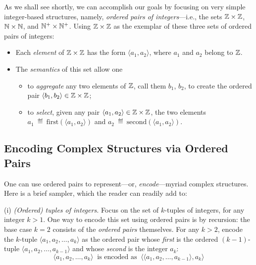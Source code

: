 As we shall see shortly, we can accomplish our goals by focusing on very simple integer-based structures, namely, {\em ordered pairs of integers}---i.e., the sets $\mathbb{Z} \times \mathbb{Z}$, $\mathbb{N} \times \mathbb{N}$, and $\mathbb{N}^+ \times \mathbb{N}^+$.  Using $\mathbb{Z} \times \mathbb{Z}$ as the exemplar of these three sets of ordered pairs of integers:
\begin{itemize}
\item
Each {\em element} of $\mathbb{Z} \times \mathbb{Z}$ has the form $\langle a_1, a_2 \rangle$, where $a_1$ and $a_2$ belong to $\mathbb{Z}$.
\medskip\item
The {\em semantics} of this set allow one
  \begin{itemize}
  \item
to {\em aggregate} any two elements of $\mathbb{Z}$, call them $b_1$, $b_2$, to create the ordered pair $\langle b_1, b_2 \rangle \in \mathbb{Z} \times \mathbb{Z}$;
  \medskip\item
to {\em select}, given any pair $\langle a_1, a_2 \rangle \in \mathbb{Z} \times \mathbb{Z}$,  the two elements $a_1 \ \eqdef \ \mbox{first}(\langle a_1, a_2 \rangle)$ and $a_2 \ \eqdef \ \mbox{second}(\langle a_1, a_2 \rangle)$.
  \end{itemize}
\end{itemize}

\subsection{Encoding Complex Structures via Ordered Pairs}
\label{sec:encodings-via-ordered-pairs}

One can use ordered pairs to represent---or, {\it encode}---myriad complex structures.  Here is a brief sampler, which the reader can readily add to:


\medskip

\noindent
(i) {\em (Ordered) tuples of integers.}
Focus on the set of $k$-tuples of integers, for any integer $k > 1$.  One way to encode this set using ordered pairs is by recursion:  the base case $k=2$ consists of the {\em ordered pairs} themselves.  For any $k > 2$, encode the $k$-tuple $\langle a_1, a_2, \ldots, a_k \rangle$ as the ordered pair whose {\em first} is the ordered $(k-1)$-tuple $\langle a_1, a_2, \ldots, a_{k-1} \rangle$ and whose {\em second} is the integer $a_k$:
\[ \langle a_1, a_2, \ldots, a_k \rangle \ \mbox{ is encoded as } \
\langle \langle a_1, a_2, \ldots, a_{k-1} \rangle, a_k \rangle \]

